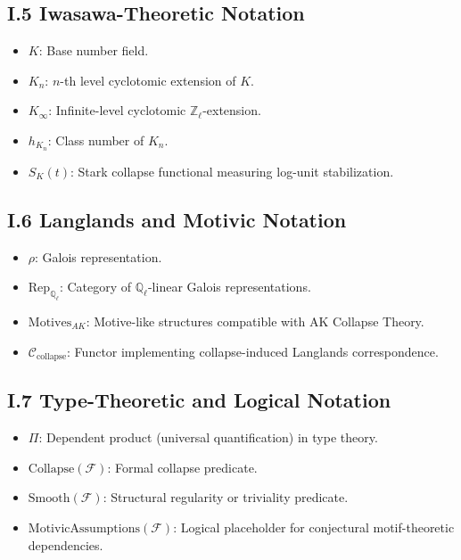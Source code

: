\documentclass[11pt]{article}
\begin{document}
\subsection*{I.5 Iwasawa-Theoretic Notation}

\begin{itemize}
    \item $K$: Base number field.
    \item $K_n$: $n$-th level cyclotomic extension of $K$.
    \item $K_\infty$: Infinite-level cyclotomic $\mathbb{Z}_\ell$-extension.
    \item $h_{K_n}$: Class number of $K_n$.
    \item $S_K(t)$: Stark collapse functional measuring log-unit stabilization.
\end{itemize}

\subsection*{I.6 Langlands and Motivic Notation}

\begin{itemize}
    \item $\rho$: Galois representation.
    \item $\mathrm{Rep}_{\mathbb{Q}_\ell}$: Category of $\mathbb{Q}_\ell$-linear Galois representations.
    \item $\mathrm{Motives}_{AK}$: Motive-like structures compatible with AK Collapse Theory.
    \item $\mathcal{C}_{\mathrm{collapse}}$: Functor implementing collapse-induced Langlands correspondence.
\end{itemize}

\subsection*{I.7 Type-Theoretic and Logical Notation}

\begin{itemize}
    \item $\Pi$: Dependent product (universal quantification) in type theory.
    \item $\mathrm{Collapse}(\mathcal{F})$: Formal collapse predicate.
    \item $\mathrm{Smooth}(\mathcal{F})$: Structural regularity or triviality predicate.
    \item $\mathrm{MotivicAssumptions}(\mathcal{F})$: Logical placeholder for conjectural motif-theoretic dependencies.
\end{itemize}
\end{document}
